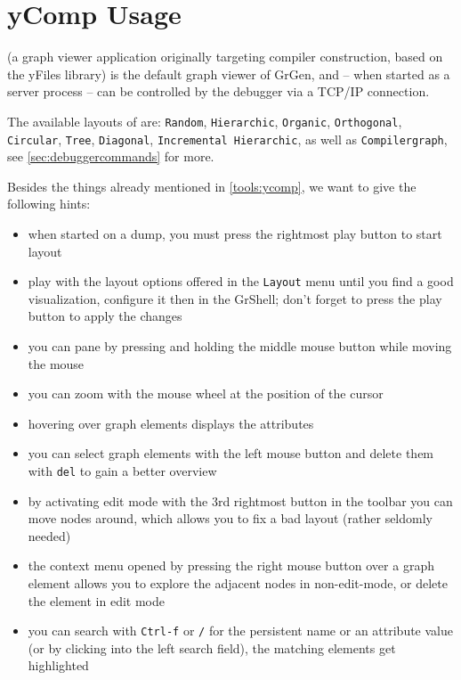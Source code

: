 \pagebreak


\section{yComp Usage}

\yComp{}\cite{ycomp} (a graph viewer application originally targeting compiler construction, based on the yFiles\cite{yfiles} library) is the default graph viewer of GrGen, and -- when started as a server process -- can be controlled by the debugger via a TCP/IP connection.

The available layouts of \yComp{} are: \texttt{Random}, \texttt{Hierarchic}, \texttt{Organic}, \texttt{Orthogonal}, \texttt{Circular}, \texttt{Tree}, \texttt{Diagonal}, \texttt{Incremental Hierarchic}, as well as \texttt{Compilergraph}, see \ref{sec:debuggercommands} for more.

Besides the things already mentioned in \ref{tools:ycomp}, we want to give the following hints:
\begin{itemize}
	\item when started on a dump, you must press the rightmost play button to start layout
	\item play with the layout options offered in the \texttt{Layout} menu until you find a good visualization, configure it then in the GrShell; don't forget to press the play button to apply the changes
	\item you can pane by pressing and holding the middle mouse button while moving the mouse
	\item you can zoom with the mouse wheel at the position of the cursor
	\item hovering over graph elements displays the attributes
	\item you can select graph elements with the left mouse button and delete them with \texttt{del} to gain a better overview
	\item by activating edit mode with the 3rd rightmost button in the toolbar you can move nodes around, which allows you to fix a bad layout (rather seldomly needed)
	\item the context menu opened by pressing the right mouse button over a graph element allows you to explore the adjacent nodes in non-edit-mode, or delete the element in edit mode
	\item you can search with \texttt{Ctrl-f} or \texttt{/} for the persistent name or an attribute value (or by clicking into the left search field), the matching elements get highlighted
\end{itemize}

